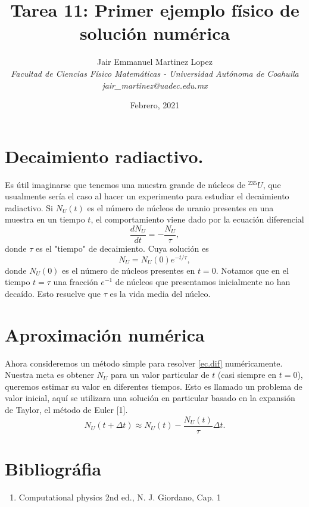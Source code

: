 \documentclass[12pt]{article}
\title{\vspace{-10mm}\fontsize{16pt}{10pt}\textbf{Tarea 11: Primer ejemplo físico de solución numérica}} %
\author{
	\normalsize Jair Emmanuel Martinez Lopez\\ %
	\textit{\normalsize Facultad de Ciencias Físico Matemáticas - Universidad Autónoma de Coahuila}\\ %
	\textit{\normalsize jair\_{}martinez@uadec.edu.mx} %
}
\date{\normalsize Febrero, 2021} %
\begin{document}
\maketitle
\thispagestyle{fancy}
\section*{Decaimiento radiactivo.}
Es útil imaginarse que tenemos una muestra grande de núcleos de  ${}^{235}U$, que usualmente sería el caso al hacer un experimento para estudiar el decaimiento radiactivo. Si $N_U(t)$ es el número de núcleos de uranio presentes en una muestra en un tiempo $t$, el comportamiento viene dado por la ecuación diferencial
\begin{equation}
	\label{ec.dif}
	\dfrac{dN_U}{dt}=-\dfrac{N_U}{\tau},
\end{equation}
donde $\tau$ es el "tiempo" de decaimiento. Cuya solución es
\begin{equation}
	\label{ec.sol}
	N_U = N_U(0)e^{-t/\tau},
\end{equation}
donde $N_U(0)$ es el número de núcleos presentes en $t=0$. Notamos que en el tiempo $t=\tau$ una fracción $e^{-1}$ de núcleos que presentamos inicialmente no han decaído. Esto resuelve que $\tau$ es la vida media del núcleo.

\section*{Aproximación numérica}
Ahora consideremos un método simple para resolver \ref{ec.dif} numéricamente. Nuestra meta es obtener $N_U$ para un valor particular de $t$ (casi siempre en $t=0$), queremos estimar su valor en diferentes tiempos. Esto es llamado un problema de valor inicial, aquí se utilizara una solución en particular basado en la expansión de Taylor, el método de Euler [1].
\begin{equation}
	\label{ec.eu}
	N_U(t+\Delta t) \approx N_U(t)-\frac{N_U(t)}{\tau}\Delta t.
\end{equation}
\section*{Bibliográfia}
\begin{enumerate}
	\item Computational physics 2nd ed., N. J. Giordano, Cap. 1
\end{enumerate}
\end{document}
